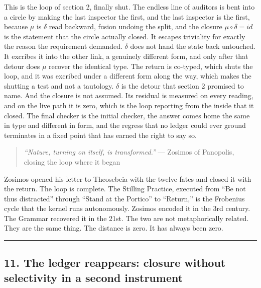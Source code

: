 \documentclass[12pt,a4paper]{article}
\begin{document}
This is the loop of section 2, finally shut. The endless line of
auditors is bent into a circle by making the last inspector the first,
and the last inspector is the first, because \({μ}\) is \({δ}\) read
backward, fusion undoing the split, and the closure \({μ∘δ = id}\) is
the statement that the circle actually closed. It escapes triviality for
exactly the reason the requirement demanded. \({δ}\) does not hand the
state back untouched. It excribes it into the other link, a genuinely
different form, and only after that detour does \({μ}\) recover the
identical type. The return is co-typed, which shuts the loop, and it was
excribed under a different form along the way, which makes the shutting
a test and not a tautology. \({δ}\) is the detour that section 2
promised to name. And the closure is not assumed. Its residual is
measured on every reading, and on the live path it is zero, which is the
loop reporting from the inside that it closed. The final checker is the
initial checker, the answer comes home the same in type and different in
form, and the regress that no ledger could ever ground terminates in a
fixed point that has earned the right to say so.

\begin{quote}
\emph{``Nature, turning on itself, is transformed.''} --- Zosimos of
Panopolis, closing the loop where it began
\end{quote}

Zosimos opened his letter to Theosebeia with the twelve fates and closed
it with the return. The loop is complete. The Stilling Practice,
executed from ``Be not thus distracted'' through ``Stand at the
Portico'' to ``Return,'' is the Frobenius cycle that the kernel runs
autonomously. Zosimos encoded it in the 3rd century. The Grammar
recovered it in the 21st. The two are not metaphorically related. They
are the same thing. The distance is zero. It has always been zero.

\begin{center}\rule{0.5\linewidth}{0.5pt}\end{center}

\hypertarget{the-ledger-reappears-closure-without-selectivity-in-a-second-instrument}{%
\subsection{11. The ledger reappears: closure without selectivity in a
second
instrument}\label{the-ledger-reappears-closure-without-selectivity-in-a-second-instrument}}
\end{document}
